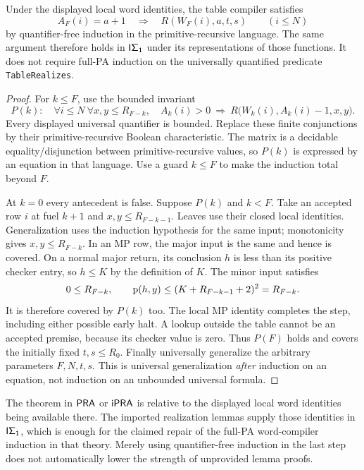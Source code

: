 \begin{theorem}\label{thm:bounded}
Under the displayed local word identities, the table compiler satisfies
\[
 A_F(i)=a+1\quad\Longrightarrow\quad R(W_F(i),a,t,s)
 \qquad(i\le N)
\]
by quantifier-free induction in the primitive-recursive language. The same
argument therefore holds in $\mathsf{I\Sigma_1}$ under its representations of those
functions. It does not require full-PA induction on the universally quantified
predicate \texttt{TableRealizes}.
\end{theorem}
\begin{proof}
For $k\le F$, use the bounded invariant
\[
 P(k):\quad
 \forall i\le N\ \forall x,y\le R_{F-k},\quad
 A_k(i)>0\ \Longrightarrow\
 R\bigl(W_k(i),A_k(i)-1,x,y\bigr).
\]
Every displayed universal quantifier is bounded. Replace these finite
conjunctions by their primitive-recursive Boolean characteristic. The
matrix is a decidable equality/disjunction between primitive-recursive
values, so $P(k)$ is expressed by an equation in that language. Use a
guard $k\le F$ to make the induction total beyond $F$.

At $k=0$ every antecedent is false. Suppose $P(k)$ and $k<F$.
Take an accepted row $i$ at fuel $k+1$ and $x,y\le R_{F-k-1}$.
Leaves use their closed local identities. Generalization uses the induction
hypothesis for the same input; monotonicity gives
$x,y\le R_{F-k}$. In an MP row, the major input is the same and hence is
covered. On a normal major return, its conclusion $h$ is less than its
positive checker entry, so $h\le K$ by the definition of $K$.
The minor input satisfies
\[
 0\le R_{F-k},\qquad
 \operatorname{p}(h,y)\le(K+R_{F-k-1}+2)^2=R_{F-k}.
\]
It is therefore covered by $P(k)$ too. The local MP identity completes
the step, including either possible early halt. A lookup outside the table
cannot be an accepted premise, because its checker value is zero.
Thus $P(F)$ holds and covers the initially fixed $t,s\le R_0$.
Finally universally generalize the arbitrary parameters $F,N,t,s$.
This is universal generalization \emph{after} induction on an equation,
not induction on an unbounded universal formula.
\end{proof}

The theorem in $\mathsf{PRA}$ or $\mathsf{iPRA}$ is relative to the displayed local word
identities being available there. The imported realization lemmas supply
those identities in $\mathsf{I\Sigma_1}$, which is enough for the claimed repair of
the full-PA word-compiler induction in that theory. Merely using
quantifier-free induction in the last step does not automatically lower
the strength of unprovided lemma proofs.

